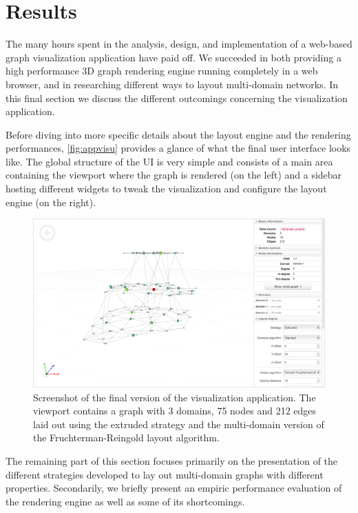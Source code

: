 \section{Results}
\label{sec:visu/results}

The many hours spent in the analysis, design, and implementation of a web-based graph visualization application have paid off. We succeeded in both providing a high performance 3D graph rendering engine running completely in a web browser, and in researching different ways to layout multi-domain networks. In this final section we discuss the different outcomings concerning the visualization application.

Before diving into more specific details about the layout engine and the rendering performances, \vref{fig:appvisu} provides a glance of what the final user interface looks like. The global structure of the UI is very simple and consists of a main area containing the viewport where the graph is rendered (on the left) and a sidebar hosting different widgets to tweak the visualization and configure the layout engine (on the right).

\begin{figure}
  \centering
  \includegraphics[width=\linewidth]{images/visuapp}
  \caption[Screenshot of the visualization application.]{Screenshot of the final version of the visualization application. The viewport contains a graph with 3 domains, 75 nodes and 212 edges laid out using the extruded strategy and the multi-domain version of the Fruchterman-Reingold layout algorithm.}
  \label{fig:appvisu}
\end{figure}

The remaining part of this section focuses primarily on the presentation of the different strategies developed to lay out multi-domain graphs with different properties. Secondarily, we briefly present an empiric performance evaluation of the rendering engine as well as some of its shortcomings.

